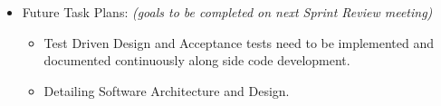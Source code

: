 \documentclass[a4paper]{article}
\begin{document}
\begin{itemize}
\item Future Task Plans: \emph{(goals to be completed on next Sprint Review meeting)}

\begin{itemize}

\item Test Driven Design and Acceptance tests need to be implemented and documented continuously along side code development.

\item Detailing Software Architecture and Design.

\end{itemize}

\end{itemize}
\end{document}
